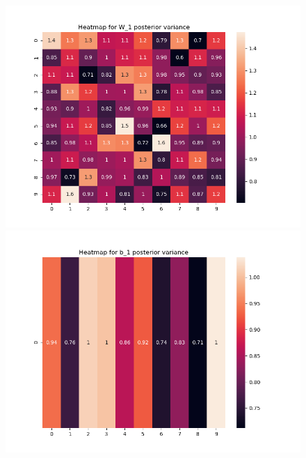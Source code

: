 \documentclass[10pt]{homeworg}
\begin{document}
\begin{figure}[!htbp]
    \centering
    \begin{minipage}{0.45\textwidth}
        \centering
       \includegraphics[scale=0.5]{figures/heatmap_var_W_1.png}
    \end{minipage}\hfill
    \begin{minipage}{0.45\textwidth}
        \centering
        \includegraphics[scale=0.5]{figures/heatmap_var_b_1.png}
    \end{minipage}
\end{figure}
\end{document}
